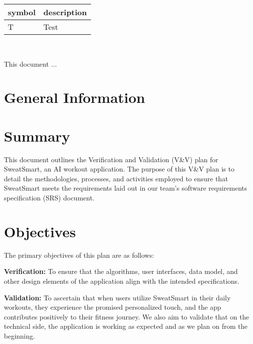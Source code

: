 \documentclass[12pt, titlepage]{article}
\begin{document}
\renewcommand{\arraystretch}{1.2}
\begin{tabular}{l l} 
  \toprule		
  \textbf{symbol} & \textbf{description}\\
  \midrule 
  T & Test\\
  \bottomrule
\end{tabular}\\



\newpage


This document ... 

\setlength\parindent{0pt}
\section{\textbf{General Information}}

\section{Summary}

This document outlines the Verification and Validation (V\&V) plan for SweatSmart, an AI workout application. The purpose of this V\&V plan is to detail the methodologies, processes, and activities employed to ensure that SweatSmart meets the requirements laid out in our team’s software requirements specification (SRS) document.

\section{Objectives}

The primary objectives of this plan are as follows: \newline

\textbf{Verification: }To ensure that the algorithms, user interfaces, data model, and other design elements of the application align with the intended specifications. \newline

\textbf{Validation: }To ascertain that when users utilize SweatSmart in their daily workouts, they experience the promised personalized touch, and the app contributes positively to their fitness journey. We also aim to validate that on the technical side, the application is working as expected and as we plan on from the beginning. \newline
\end{document}
